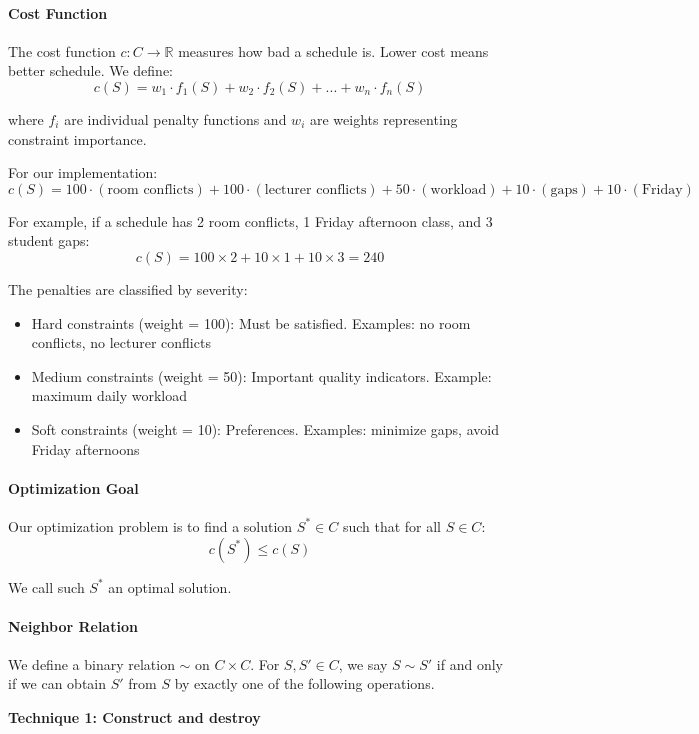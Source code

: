 \documentclass[11pt,a4paper]{article}
\begin{document}
\paragraph{Cost Function}

The cost function $c : C \to \mathbb{R}$ measures how bad a schedule is. Lower cost means better schedule. We define:
$$c(S) = w_1 \cdot f_1(S) + w_2 \cdot f_2(S) + ... + w_n \cdot f_n(S)$$

where $f_i$ are individual penalty functions and $w_i$ are weights representing constraint importance.

For our implementation:
$$c(S) = 100 \cdot (\text{room conflicts}) + 100 \cdot (\text{lecturer conflicts}) + 50 \cdot (\text{workload}) + 10 \cdot (\text{gaps}) + 10 \cdot (\text{Friday})$$

For example, if a schedule has 2 room conflicts, 1 Friday afternoon class, and 3 student gaps:
$$c(S) = 100 \times 2 + 10 \times 1 + 10 \times 3 = 240$$

The penalties are classified by severity:
\begin{itemize}
    \item Hard constraints (weight = 100): Must be satisfied. Examples: no room conflicts, no lecturer conflicts
    \item Medium constraints (weight = 50): Important quality indicators. Example: maximum daily workload
    \item Soft constraints (weight = 10): Preferences. Examples: minimize gaps, avoid Friday afternoons
\end{itemize}

\paragraph{Optimization Goal}

Our optimization problem is to find a solution $S^* \in C$ such that for all $S \in C$:
$$c(S^*) \leq c(S)$$

We call such $S^*$ an optimal solution.

\paragraph{Neighbor Relation}

We define a binary relation $\sim$ on $C \times C$. For $S, S' \in C$, we say $S \sim S'$ if and only if we can obtain $S'$ from $S$ by exactly one of the following operations.

\textbf{Technique 1: Construct and destroy}
\end{document}
